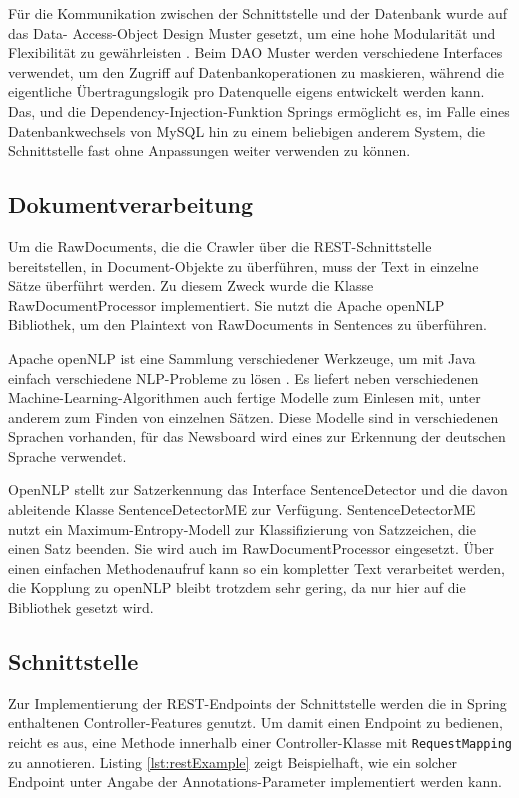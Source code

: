 Für die Kommunikation zwischen der Schnittstelle und der Datenbank wurde auf das Data-
Access-Object Design Muster gesetzt, um eine hohe Modularität und Flexibilität zu
gewährleisten \cite{dao-pattern}. Beim DAO Muster werden verschiedene Interfaces
verwendet, um den Zugriff auf Datenbankoperationen zu maskieren, während die eigentliche
Übertragungslogik pro Datenquelle eigens entwickelt werden kann. Das, und die
Dependency-Injection-Funktion Springs ermöglicht es, im Falle eines Datenbankwechsels von
MySQL hin zu einem beliebigen anderem System, die Schnittstelle fast ohne Anpassungen
weiter verwenden zu können.

\subsection{Dokumentverarbeitung}
Um die RawDocuments, die die Crawler über die REST-Schnittstelle bereitstellen,
in Document-Objekte zu überführen, muss der Text in einzelne Sätze überführt werden.
Zu diesem Zweck wurde die Klasse RawDocumentProcessor implementiert. Sie nutzt die
Apache openNLP Bibliothek, um den Plaintext von RawDocuments in Sentences zu überführen.

Apache openNLP ist eine Sammlung verschiedener Werkzeuge, um mit Java einfach verschiedene 
NLP-Probleme zu lösen \cite{opennlp}. Es liefert neben verschiedenen 
Machine-Learning-Algorithmen auch fertige Modelle zum Einlesen mit, unter anderem
zum Finden von einzelnen Sätzen. Diese Modelle sind in verschiedenen Sprachen vorhanden,
für das Newsboard wird eines zur Erkennung der deutschen Sprache verwendet.

OpenNLP stellt zur Satzerkennung das Interface SentenceDetector und die davon ableitende
Klasse SentenceDetectorME zur Verfügung. SentenceDetectorME nutzt ein Maximum-Entropy-Modell
zur Klassifizierung von Satzzeichen, die einen Satz beenden. Sie wird auch im
RawDocumentProcessor eingesetzt. Über einen einfachen Methodenaufruf kann so ein kompletter
Text verarbeitet werden, die Kopplung zu openNLP bleibt trotzdem sehr gering, da nur hier
auf die Bibliothek gesetzt wird.

\subsection{Schnittstelle}
Zur Implementierung der REST-Endpoints der Schnittstelle werden die in Spring enthaltenen
Controller-Features genutzt. Um damit einen Endpoint zu bedienen, reicht es aus,
eine Methode innerhalb einer Controller-Klasse mit \texttt{RequestMapping} zu annotieren.
Listing \ref{lst:restExample} zeigt Beispielhaft, wie ein solcher Endpoint unter Angabe der
Annotations-Parameter implementiert werden kann.

